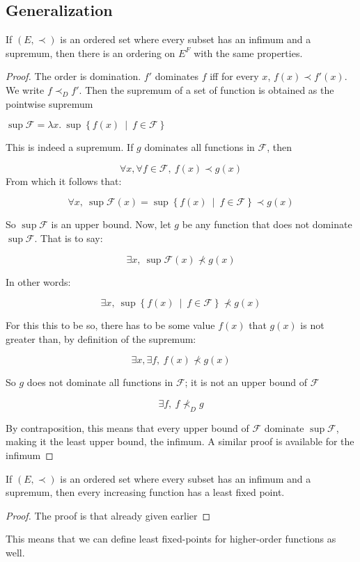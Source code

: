 \begin{nothing}
\subsection{Generalization}
If $(E, \prec)$ is an ordered set where every subset has an infimum and a supremum, then there is an ordering on $E^F$ with the same properties.

\begin{proof}
The order is domination. $f'$ dominates $f$ iff for every $x$, $f(x)\prec f'(x)$. We write $f\prec_D f'$. Then the supremum of a set of function is obtained as the pointwise supremum

$\sup \mathcal F = \lambda x.\ \sup\left\lbrace f(x)\ \middle|\ f\in \mathcal{F}\right\rbrace$

This is indeed a supremum. If $g$ dominates all functions in $\mathcal F$, then

$$\forall x,\forall f\in\mathcal{F},\ f(x)\prec g(x)$$
From which it follows that:

$$\forall x,\ \sup \mathcal F(x) = \sup\left\lbrace f(x)\ \middle|\ f\in \mathcal{F}\right\rbrace\prec g(x)$$

So $\sup \mathcal F$ is an upper bound. Now, let $g$ be any function that does not dominate $\sup \mathcal{F}$. That is to say:

$$\exists x,\ \sup \mathcal{F}(x)\not\prec g(x) $$

In other words:

$$\exists x,\ \sup\left\lbrace f(x)\ \middle|\ f\in \mathcal{F}\right\rbrace\not\prec g(x) $$

For this this to be so, there has to be some value $f(x)$ that $g(x)$ is not greater than, by definition of the supremum:

$$\exists x,\exists f,\ f(x)\not\prec g(x) $$

So $g$ does not dominate all functions in $\mathcal F$; it is not an upper bound of $\mathcal F$

$$\exists f,\ f\not\prec_D g $$

By contraposition, this means that every upper bound of $\mathcal F$ dominate $\sup \mathcal F$, making it the least upper bound, the infimum.
A similar proof is available for the infimum
\end{proof}

If $(E, \prec)$ is an ordered set where every subset has an infimum and a supremum, then every increasing function has a least fixed point.

\begin{proof}
The proof is that already given earlier
\end{proof}

This means that we can define least fixed-points for higher-order functions as well.
\end{nothing}


